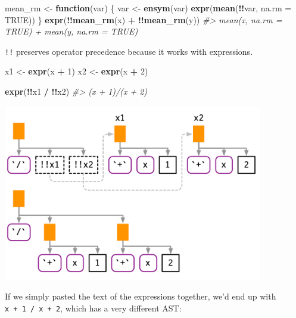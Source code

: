 \documentclass[]{book}
\newenvironment{Shaded}{\begin{snugshade}}{\end{snugshade}}
\newcommand{\CommentTok}[1]{\textcolor[rgb]{0.37,0.37,0.37}{\textit{#1}}}
\newcommand{\ControlFlowTok}[1]{\textcolor[rgb]{0.27,0.27,0.27}{\textbf{#1}}}
\newcommand{\DataTypeTok}[1]{\textcolor[rgb]{0.27,0.27,0.27}{#1}}
\newcommand{\DecValTok}[1]{\textcolor[rgb]{0.06,0.06,0.06}{#1}}
\newcommand{\KeywordTok}[1]{\textcolor[rgb]{0.27,0.27,0.27}{\textbf{#1}}}
\newcommand{\NormalTok}[1]{#1}
\newcommand{\OperatorTok}[1]{\textcolor[rgb]{0.43,0.43,0.43}{\textbf{#1}}}
\newcommand{\OtherTok}[1]{\textcolor[rgb]{0.37,0.37,0.37}{#1}}
\newcommand{\StringTok}[1]{\textcolor[rgb]{0.5,0.5,0.5}{#1}}
\begin{document}
\begin{Shaded}
\begin{Highlighting}[]
\NormalTok{mean_rm <-}\StringTok{ }\ControlFlowTok{function}\NormalTok{(var) \{}
\NormalTok{  var <-}\StringTok{ }\KeywordTok{ensym}\NormalTok{(var)}
  \KeywordTok{expr}\NormalTok{(}\KeywordTok{mean}\NormalTok{(}\OperatorTok{!!}\NormalTok{var, }\DataTypeTok{na.rm =} \OtherTok{TRUE}\NormalTok{))}
\NormalTok{\}}
\KeywordTok{expr}\NormalTok{(}\OperatorTok{!!}\KeywordTok{mean_rm}\NormalTok{(x) }\OperatorTok{+}\StringTok{ }\OperatorTok{!!}\KeywordTok{mean_rm}\NormalTok{(y))}
\CommentTok{#> mean(x, na.rm = TRUE) + mean(y, na.rm = TRUE)}
\end{Highlighting}
\end{Shaded}

\texttt{!!} preserves operator precedence because it works with expressions.

\begin{Shaded}
\begin{Highlighting}[]
\NormalTok{x1 <-}\StringTok{ }\KeywordTok{expr}\NormalTok{(x }\OperatorTok{+}\StringTok{ }\DecValTok{1}\NormalTok{)}
\NormalTok{x2 <-}\StringTok{ }\KeywordTok{expr}\NormalTok{(x }\OperatorTok{+}\StringTok{ }\DecValTok{2}\NormalTok{)}

\KeywordTok{expr}\NormalTok{(}\OperatorTok{!!}\NormalTok{x1 }\OperatorTok{/}\StringTok{ }\OperatorTok{!!}\NormalTok{x2)}
\CommentTok{#> (x + 1)/(x + 2)}
\end{Highlighting}
\end{Shaded}

\begin{center}\includegraphics[width=4.47in]{diagrams/quotation/infix} \end{center}

If we simply pasted the text of the expressions together, we'd end up with \texttt{x\ +\ 1\ /\ x\ +\ 2}, which has a very different AST:
\end{document}
